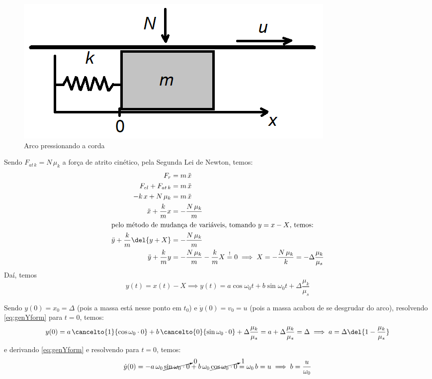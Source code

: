 \documentclass[]{IMTexam}
\begin{document}
\begin{questions}
\begin{parts}
		\begin{figure}[H]
			\centering
			\includegraphics[width=0.5\linewidth]{screenshot003}
			\caption{Arco pressionando a corda}
			\label{fig:fig3}
		\end{figure}

		\begin{solution}
			Sendo $ F_{at\,k}=N\,\mu_k $ a força de atrito cinético, pela Segunda Lei de Newton, temos:
			\begin{align*}
				F_r                            & =m\,\ddot{x}                                                                                                   \\
				F_{el}+F_{at\,k}               & =m\,\ddot{x}                                                                                                   \\
				-k\,x+N\,\mu_k                 & =m\,\ddot{x}                                                                                                   \\
				\ddot{x}+\dfrac{k}{m}x         & =-\dfrac{N\,\mu_k}{m}                                                                                          \\
				\intertext{pelo método de mudança de variáveis, tomando $ y=x-X $, temos:}
				\ddot{y}+\dfrac{k}{m}\del{y+X} & =-\dfrac{N\,\mu_k}{m}                                                                                          \\
				\ddot{y}+\dfrac{k}{m}y         & =-\dfrac{N\,\mu_k}{m}-\dfrac{k}{m}X\stackrel{!}{=}0\implies X=-\dfrac{N\,\mu_k}{k}=-\Delta\dfrac{\mu_k}{\mu_s}
			\end{align*}
			Daí, temos
			\begin{equation}\label{eq:genYform}
				y(t)=x(t)-X\implies y(t)=a\cos\omega_0t+b\sin\omega_0t+\Delta\dfrac{\mu_k}{\mu_s}
			\end{equation}

			Sendo $ y(0)=x_0=\Delta $ (pois a massa está nesse ponto em $ t_0 $) e $ \dot{y}(0)=v_0=u $ (pois a massa acabou de se desgrudar do arco), resolvendo \ref{eq:genYform} para $ t=0 $, temos:
			\[ y(0)=a\,\cancelto{1}{\cos\omega_0\cdot0}+b\,\cancelto{0}{\sin\omega_0\cdot0}+\Delta\dfrac{\mu_k}{\mu_s}=a+\Delta\dfrac{\mu_k}{\mu_s}=\Delta\implies a=\Delta\del{1-\dfrac{\mu_k}{\mu_s}} \]
			e derivando \ref{eq:genYform} e resolvendo para $ t=0 $, temos:
			\[ \dot{y}(0)=-a\,\omega_0\,\cancelto{0}{\sin\omega_0\cdot0}+b\,\omega_0\,\cancelto{1}{\cos\omega_0\cdot0}=\omega_0\,b=u\implies b=\dfrac{u}{\omega_0} \]


\end{solution}
\end{parts}
\end{questions}
\end{document}
